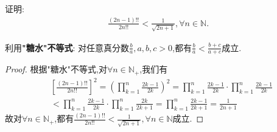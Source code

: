 \documentclass[../../main.tex]{subfiles}
\begin{document}
\begin{example}
证明:\begin{align*}
\frac{\left( 2n-1 \right) !!}{2n!!}<\frac{1}{\sqrt{2n+1}},\forall n\in \mathbb{N} .
\end{align*}
\end{example}
\begin{note}
利用\hypertarget{"糖水"不等式}{\textbf{"糖水"不等式}}:
对任意真分数$\frac{b}{a},a,b,c>0$,都有$\frac{b}{a}<\frac{b+c}{a+c}$成立.
\end{note}
\begin{proof}
根据\hypertarget{"糖水"不等式}{"糖水"不等式},对$\forall n\in \mathbb{N}_+$,我们有
\begin{align*}
&\left[ \frac{\left( 2n-1 \right) !!}{2n!!} \right] ^2=\left( \prod_{k=1}^n{\frac{2k-1}{2k}} \right) ^2=\prod_{k=1}^n{\frac{2k-1}{2k}}\cdot \prod_{k=1}^n{\frac{2k-1}{2k}}
\\
&<\prod_{k=1}^n{\frac{2k-1}{2k}}\cdot \prod_{k=1}^n{\frac{2k}{2k+1}}=\prod_{k=1}^n{\frac{2k-1}{2k+1}}=\frac{1}{2n+1}
\end{align*}
故对$\forall n\in \mathbb{N}_+$,都有$\frac{\left( 2n-1 \right) !!}{2n!!}<\frac{1}{\sqrt{2n+1}},\forall n\in \mathbb{N}$成立.
\end{proof}
\end{document}
